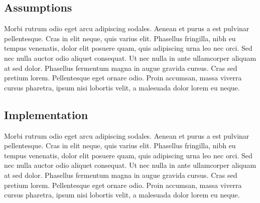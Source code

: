 
\subsection{Assumptions}
Morbi rutrum odio eget arcu adipiscing sodales. Aenean et purus a est pulvinar pellentesque. Cras in elit neque, quis varius elit. Phasellus fringilla, nibh eu tempus venenatis, dolor elit posuere quam, quis adipiscing urna leo nec orci. Sed nec nulla auctor odio aliquet consequat. Ut nec nulla in ante ullamcorper aliquam at sed dolor. Phasellus fermentum magna in augue gravida cursus. Cras sed pretium lorem. Pellentesque eget ornare odio. Proin accumsan, massa viverra cursus pharetra, ipsum nisi lobortis velit, a malesuada dolor lorem eu neque.


\subsection{Implementation}
Morbi rutrum odio eget arcu adipiscing sodales. Aenean et purus a est pulvinar pellentesque. Cras in elit neque, quis varius elit. Phasellus fringilla, nibh eu tempus venenatis, dolor elit posuere quam, quis adipiscing urna leo nec orci. Sed nec nulla auctor odio aliquet consequat. Ut nec nulla in ante ullamcorper aliquam at sed dolor. Phasellus fermentum magna in augue gravida cursus. Cras sed pretium lorem. Pellentesque eget ornare odio. Proin accumsan, massa viverra cursus pharetra, ipsum nisi lobortis velit, a malesuada dolor lorem eu neque.
